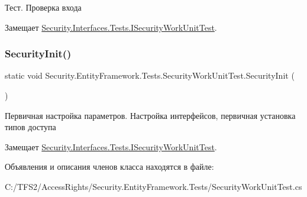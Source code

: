 Тест. Проверка входа 



Замещает \hyperlink{interface_security_1_1_interfaces_1_1_tests_1_1_i_security_work_unit_test_a5353dbe8f678db00b4a49d946cf517f7}{Security.\+Interfaces.\+Tests.\+I\+Security\+Work\+Unit\+Test}.

\mbox{\label{class_security_1_1_entity_framework_1_1_tests_1_1_security_work_unit_test_acf6d718d3dbd7c4ece47dddef6f1e6f8}} 
\subsubsection{\texorpdfstring{Security\+Init()}{SecurityInit()}}
{\footnotesize\ttfamily static void Security.\+Entity\+Framework.\+Tests.\+Security\+Work\+Unit\+Test.\+Security\+Init (\begin{DoxyParamCaption}{ }\end{DoxyParamCaption})\hspace{0.3cm}{\ttfamily [static]}}



Первичная настройка параметров. Настройка интерфейсов, первичная установка типов доступа 



Замещает \hyperlink{interface_security_1_1_interfaces_1_1_tests_1_1_i_security_work_unit_test_ad4c83a70952c1dfcdc15c1dc29b223a2}{Security.\+Interfaces.\+Tests.\+I\+Security\+Work\+Unit\+Test}.



Объявления и описания членов класса находятся в файле\+:\begin{DoxyCompactItemize}
\item 
C\+:/\+T\+F\+S2/\+Access\+Rights/\+Security.\+Entity\+Framework.\+Tests/Security\+Work\+Unit\+Test.\+cs\end{DoxyCompactItemize}
